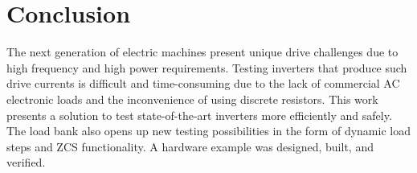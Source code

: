 \documentclass{article}
\begin{document}
\section{Conclusion}
\label{sec:conclusion}

The next generation of electric machines present unique drive challenges due to high frequency and high power requirements. Testing inverters that produce such drive currents is difficult and time-consuming due to the lack of commercial AC electronic loads and the inconvenience of using discrete resistors. This work presents a solution to test state-of-the-art inverters more efficiently and safely. The load bank also opens up new testing possibilities in the form of dynamic load steps and ZCS functionality. A hardware example was designed, built, and verified.



\vspace{0.5cm}


\end{document}
